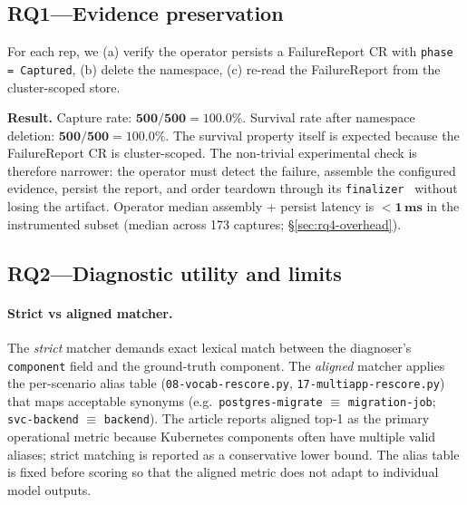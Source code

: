 \documentclass[sigconf, nonacm=true, anonymous=false, review=false]{acmart}
\newcommand{\RQ}[1]{RQ#1\xspace}
\newcommand{\fp}{FailureReport\xspace}
\begin{document}
\subsection{\RQ{1}---Evidence preservation}
\label{sec:rq1}

For each rep, we (a) verify the operator persists a \fp{} CR with
\texttt{phase = Captured}, (b) delete the namespace, (c) re-read the
\fp{} from the cluster-scoped store.

\textbf{Result.} Capture rate: $\mathbf{500/500} = 100.0\%$. Survival
rate after namespace deletion: $\mathbf{500/500} = 100.0\%$. The survival
property itself is expected because the \fp{} CR is cluster-scoped. The
non-trivial experimental check is therefore narrower: the operator must
detect the failure, assemble the configured evidence, persist the report,
and order teardown through its \texttt{finalizer}~\cite{kubernetes_finalizers}
without losing the artifact. Operator median assembly + persist latency is
$\mathbf{<1\,\text{ms}}$ in the instrumented subset
(median across 173 captures; \S\ref{sec:rq4-overhead}).

\subsection{\RQ{2}---Diagnostic utility and limits}
\label{sec:rq2}

\paragraph{Strict vs aligned matcher.} The \emph{strict} matcher
demands exact lexical match between the diagnoser's
\texttt{component} field and the ground-truth component. The
\emph{aligned} matcher applies the per-scenario alias table
(\texttt{08-vocab-rescore.py}, \texttt{17-multiapp-rescore.py}) that
maps acceptable synonyms (e.g.\ \texttt{postgres-migrate} $\equiv$
\texttt{migration-job}; \texttt{svc-backend} $\equiv$
\texttt{backend}). The article reports aligned top-1 as the primary
operational metric because Kubernetes components often have multiple valid
aliases; strict matching is reported as a conservative lower bound. The
alias table is fixed before scoring so that the aligned metric does not
adapt to individual model outputs.
\end{document}
